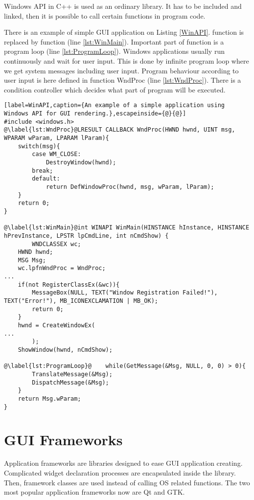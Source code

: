Windows API in C++ is used as an ordinary library. It has to be included and linked, then it is possible to call certain functions in program code.

There is an example of simple GUI application on Listing \ref{WinAPI}.  function is replaced by  function (line \ref{lst:WinMain}). Important part of  function is a program loop (line \ref{lst:ProgramLoop}). Windows applications usually run continuously and wait for user input. This is done by infinite program loop where we get system messages including user input. Program behaviour according to user input is here defined in function WndProc (line \ref{lst:WndProc}). There is a condition controller which decides what part of program will be executed.

\begin{lstlisting}[label=WinAPI,caption={An example of a simple application using Windows API for GUI rendering.},escapeinside={@}{@}]
#include <windows.h>
@\label{lst:WndProc}@LRESULT CALLBACK WndProc(HWND hwnd, UINT msg, WPARAM wParam, LPARAM lParam){
    switch(msg){
        case WM_CLOSE:
            DestroyWindow(hwnd);
        break;
        default:
            return DefWindowProc(hwnd, msg, wParam, lParam);
    }
    return 0;
}

@\label{lst:WinMain}@int WINAPI WinMain(HINSTANCE hInstance, HINSTANCE hPrevInstance, LPSTR lpCmdLine, int nCmdShow) {
		WNDCLASSEX wc;
    HWND hwnd;
    MSG Msg;
    wc.lpfnWndProc = WndProc;    
...
    if(not RegisterClassEx(&wc)){
        MessageBox(NULL, TEXT("Window Registration Failed!"), TEXT("Error!"), MB_ICONEXCLAMATION | MB_OK);
        return 0;
    }
    hwnd = CreateWindowEx(
...
		);
    ShowWindow(hwnd, nCmdShow);

@\label{lst:ProgramLoop}@    while(GetMessage(&Msg, NULL, 0, 0) > 0){
        TranslateMessage(&Msg);
        DispatchMessage(&Msg);
    }
    return Msg.wParam;
}
\end{lstlisting}

\section{GUI Frameworks}
Application frameworks are libraries designed to ease GUI application creating. Complicated widget declaration processes are encapsulated inside the library. Then, framework classes are used instead of calling OS related functions. The two most popular application frameworks now are Qt and GTK.

